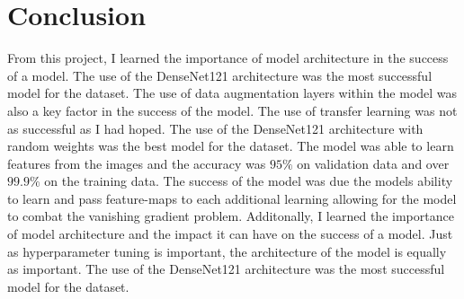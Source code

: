 \documentclass[conference]{IEEEtran}
\begin{document}
\section{Conclusion}

From this project, I learned the importance of model architecture in the success of a model. The use of the DenseNet121 architecture was the most successful model for the dataset. The use of data augmentation layers within the model was also a key factor in the success of the model. The use of transfer learning was not as successful as I had hoped. The use of the DenseNet121 architecture with random weights was the best model for the dataset. The model was able to learn features from the images and the accuracy was $95\%$ on validation data and over $99.9\%$ on the training data. The success of the model was due the models ability to learn and pass feature-maps to each additional learning allowing for the model to combat the vanishing gradient problem. Additonally, I learned the importance of model architecture and the impact it can have on the success of a model. Just as hyperparameter tuning is important, the architecture of the model is equally as important. The use of the DenseNet121 architecture was the most successful model for the dataset. 



\end{document}
